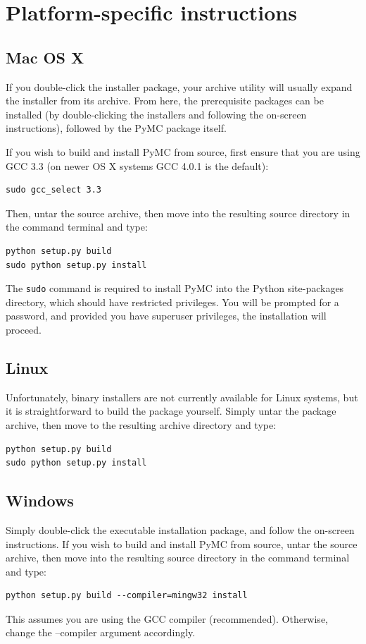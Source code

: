 \documentclass[]{book}
\begin{document}
\section{Platform-specific instructions}
\subsection{Mac OS X}

If you double-click the installer package, your archive utility will usually expand the installer from its archive. From here, the prerequisite packages can be installed (by double-clicking the installers and following the on-screen instructions), followed by the PyMC package itself.

If you wish to build and install PyMC from source, first ensure that you are using GCC 3.3 (on newer OS X systems GCC 4.0.1 is the default):
\begin{verbatim}
sudo gcc_select 3.3
\end{verbatim}
Then, untar the source archive, then move into the resulting source directory in the command terminal and type:
\begin{verbatim}
python setup.py build
sudo python setup.py install
\end{verbatim}
The \verb=sudo= command is required to install PyMC into the Python site-packages directory, which should have restricted privileges. You will be prompted for a password, and provided you have superuser privileges, the installation will proceed.

\subsection{Linux}

Unfortunately, binary installers are not currently available for Linux systems, but it is straightforward to build the package yourself. Simply untar the package archive, then move to the resulting archive directory and type:
\begin{verbatim}
python setup.py build
sudo python setup.py install
\end{verbatim}

\subsection{Windows}

Simply double-click the executable installation package, and follow the on-screen instructions.
If you wish to build and install PyMC from source, untar the source archive, then move into the resulting source directory in the command terminal and type:
\begin{verbatim}
python setup.py build --compiler=mingw32 install
\end{verbatim}
This assumes you are using the GCC compiler (recommended). Otherwise, change the --compiler argument accordingly.
\end{document}

